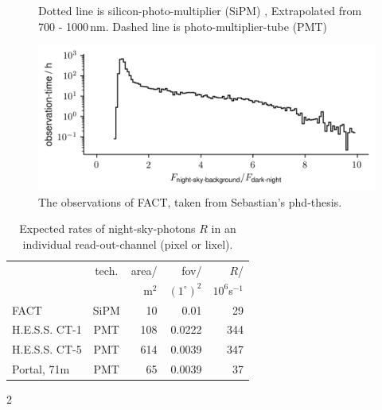 \documentclass{article}%
\begin{document}
\begin{multicols}{2}
\begin{figure}[H]
\caption{
Dotted line is silicon-photo-multiplier (SiPM) \cite{hamamatsu2009mppc},
Extrapolated from 700 - 1000\,nm.
Dashed line is photo-multiplier-tube (PMT) \cite{toyama2013novel}
}%
\label{fig:pde}
\end{figure}
%
\begin{figure}[H]%
\centering%
\includegraphics[width=1.0\linewidth]{observation_time_histogram.png}%
\caption{
The observations of FACT, taken from Sebastian's phd-thesis.
}%
\label{fig:obstimeFact}
\end{figure}
%
\begin{table}[H]
  \begin{center}
    \begin{tabular}{lcrrr}
        &tech.& area/ & fov/&$R$/\\
        &     & m$^2$ & $(1^\circ)^{2}$&$10^6$s$^{-1}$\\
      \hline
      FACT &SiPM& 10 & 0.01 & 29\\
      H.E.S.S. CT-1 &PMT& 108 & 0.0222 & 344\\
      H.E.S.S. CT-5 &PMT& 614 & 0.0039 & 347\\
      Portal, 71m &PMT& 65 & 0.0039 & 37\\
    \end{tabular}
    \caption{Expected rates of night-sky-photons $R$ in an individual read-out-channel (pixel or lixel).}
    \label{TabInstrumentsNsbRates}
  \end{center}
\end{table}
%
%
%
\end{multicols}{2}%
\end{document}
